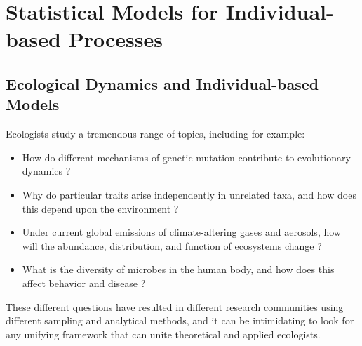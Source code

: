 \chapter{Statistical Models for Individual-based Processes} \label{Chap1}

\section{Ecological Dynamics and Individual-based Models} \label{sec:Chap1_IBMs}

Ecologists study a tremendous range of topics, including for example:
\begin{itemize}
  \item How do different mechanisms of genetic mutation contribute to evolutionary dynamics \cite{hoffmann_revisiting_2008}?

  \item Why do particular traits arise independently in unrelated taxa, and how does this depend upon the environment \cite{pyenson_ecological_2017}?

  \item Under current global emissions of climate-altering gases and aerosols, how will the abundance, distribution, and function of ecosystems change \cite{li_spatial_2019}? 

  \item What is the diversity of microbes in the human body, and how does this affect behavior and disease \cite{dunn_internal_2020}?
\end{itemize}
These different questions have resulted in different research communities using different sampling and analytical methods, and it can be intimidating to look for any unifying framework that can unite theoretical and applied ecologists.

